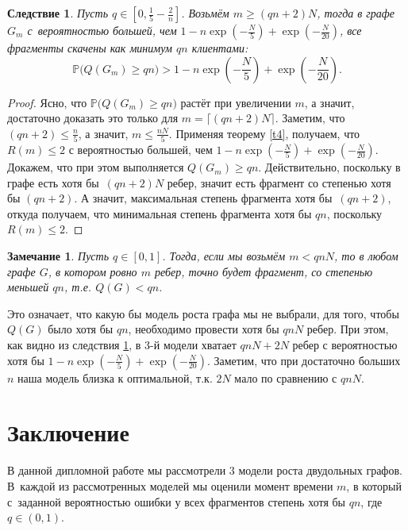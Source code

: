 \documentclass{matmex-diploma-custom}
\newcommand{\PRob}{\mathbb P}
\newcommand{\leqs}{\leqslant}
\newcommand{\geqs}{\geqslant}
\newtheorem{note}{Замечание}
\newtheorem{cons}{Следствие}
\theoremstyle{named}
\begin{document}
\begin{cons} \label{c2}
Пусть $q \in [0, \frac{1}{5} - \frac{2}{n}]$. 
Возьмём $m \geqs (qn + 2) N$, тогда в графе $G_m$ с~вероятностью большей, чем 
$1 - n\exp\left(-\frac{N}{5}\right) +  \exp\left(- \frac{N}{20}\right)$, все фрагменты скачены как минимум $qn$ клиентами:
\begin{equation}
\PRob\Big( Q(G_m) \geqs qn \Big) > 1 - n\exp\left(-\frac{N}{5}\right) +  \exp\left(- \frac{N}{20}\right).
\end{equation}
\end{cons}
\begin{proof}
Ясно, что $\PRob\Big( Q(G_m) \geqs qn \Big)$ растёт при увеличении $m$, а значит, 
достаточно доказать это только для $m = \lceil(qn + 2) N\rceil$. 
Заметим, что $(qn + 2) \leqs \frac{n}{5}$, а значит, $m \leqs \frac{nN}{5}$.
Применяя теорему \ref{t4}, получаем, что $R(m) \leqs 2$ с вероятностью большей, 
чем $1 - n\exp\left(-\frac{N}{5}\right) +  \exp\left(- \frac{N}{20}\right)$.
Докажем, что при этом выполняется $ Q(G_m) \geqs qn$.
Действительно, поскольку в графе есть хотя бы~$(qn + 2) N$ ребер, значит есть фрагмент со степенью хотя бы $(qn + 2)$.
А значит, максимальная степень фрагмента хотя бы~$(qn+2)$, откуда получаем, что минимальная степень фрагмента хотя бы $qn$, 
поскольку $R(m) \leqs 2$.
\end{proof}

\begin{note}
Пусть $q \in [0,1]$. Тогда, если мы возьмём $m < qnN$, то в любом графе $G$, в котором ровно $m$ ребер, точно будет фрагмент, 
со степенью меньшей $qn$, т.е. $Q(G) < qn$.
\end{note}

Это означает, что какую бы модель роста графа мы не выбрали, для того, чтобы~$Q(G)$ было хотя бы $qn$, необходимо
провести хотя бы $qnN$ ребер. 
При этом, как видно из следствия \ref{c2}, в 3-й модели хватает $qnN + 2N$ ребер
 с вероятностью хотя бы $1 - n\exp\left(-\frac{N}{5}\right) +  \exp\left(- \frac{N}{20}\right)$.
Заметим, что при достаточно больших $n$ наша модель близка к оптимальной, т.к. $2N$ мало по сравнению с $qnN$.
\newpage

\section*{Заключение}
В данной дипломной работе мы рассмотрели $3$ модели роста двудольных графов.
В~каждой из рассмотренных моделей мы оценили момент времени $m$, 
в который с~заданной вероятностью ошибки у всех фрагментов степень хотя бы $qn$, где $q \in (0,1)$.
\end{document}
